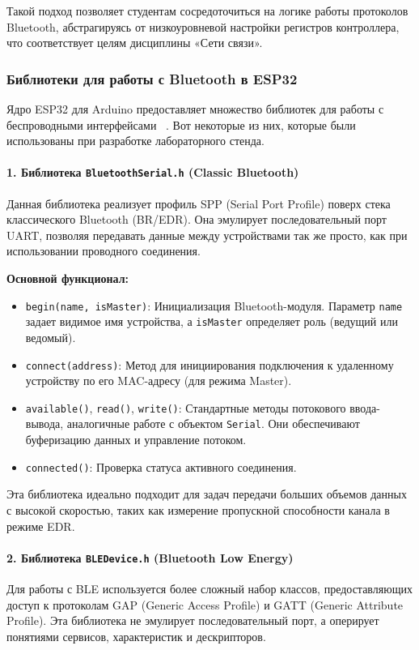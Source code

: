 Такой подход позволяет студентам сосредоточиться на логике работы протоколов Bluetooth, абстрагируясь от низкоуровневой настройки регистров контроллера, что соответствует целям дисциплины «Сети связи».

\subsubsection{Библиотеки для работы с Bluetooth в ESP32}

Ядро ESP32 для Arduino предоставляет множество библиотек для работы с беспроводными интерфейсами ~\cite{esp32_arduino_github}. Вот некоторые из них, которые были использованы при разработке лабораторного стенда.

\paragraph{1. Библиотека \texttt{BluetoothSerial.h} (Classic Bluetooth)}
Данная библиотека реализует профиль SPP (Serial Port Profile) поверх стека классического Bluetooth (BR/EDR). Она эмулирует последовательный порт UART, позволяя передавать данные между устройствами так же просто, как при использовании проводного соединения.

\textbf{Основной функционал:}
\begin{itemize}[nosep]
    \item \texttt{begin(name, isMaster)}: Инициализация Bluetooth-модуля. Параметр \texttt{name} задает видимое имя устройства, а \texttt{isMaster} определяет роль (ведущий или ведомый).
    \item \texttt{connect(address)}: Метод для инициирования подключения к удаленному устройству по его MAC-адресу (для режима Master).
    \item \texttt{available()}, \texttt{read()}, \texttt{write()}: Стандартные методы потокового ввода-вывода, аналогичные работе с объектом \texttt{Serial}. Они обеспечивают буферизацию данных и управление потоком.
    \item \texttt{connected()}: Проверка статуса активного соединения.
\end{itemize}

Эта библиотека идеально подходит для задач передачи больших объемов данных с высокой скоростью, таких как измерение пропускной способности канала в режиме EDR.

\paragraph{2. Библиотека \texttt{BLEDevice.h} (Bluetooth Low Energy)}
Для работы с BLE используется более сложный набор классов, предоставляющих доступ к протоколам GAP (Generic Access Profile) и GATT (Generic Attribute Profile). Эта библиотека не эмулирует последовательный порт, а оперирует понятиями сервисов, характеристик и дескрипторов.

